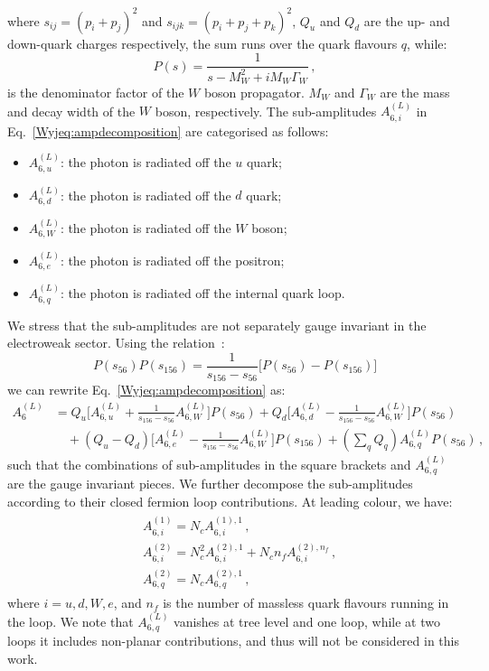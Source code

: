 \documentclass[main.tex]{subfiles}
\begin{document}
where $s_{ij}=(p_i+p_j)^2$ and $s_{ijk}=(p_i+p_j+p_k)^2$, $Q_u$ and $Q_d$ are the up- and down-quark charges respectively, the sum runs over the quark flavours $q$, while: 
\begin{equation}
P(s) = \frac{1}{s-M_W^2+i M_W \Gamma_W} \,,
\end{equation}
is the denominator factor of the $W$ boson propagator. 
$M_W$ and $\Gamma_W$ are the mass and decay width of the $W$ boson, respectively.
The sub-amplitudes $A_{6,i}^{(L)}$ in Eq.~\ref{Wyjeq:ampdecomposition} are categorised as follows:
\begin{itemize}
\item $A^{(L)}_{6,u}$: the photon is radiated off the $u$ quark;
\item $A^{(L)}_{6,d}$: the photon is radiated off the $d$ quark;
\item $A^{(L)}_{6,W}$: the photon is radiated off the $W$ boson;
\item $A^{(L)}_{6,e}$: the photon is radiated off the positron;
\item $A^{(L)}_{6,q}$: the photon is radiated off the internal quark loop.
\end{itemize}
%
We stress that the sub-amplitudes are not separately gauge invariant in the electroweak sector.
Using the relation~\cite{Campbell:2021mlr}:
\begin{equation}
P(s_{56})P(s_{156}) = \frac{1}{s_{156}-s_{56}} \bigg[ P(s_{56}) - P(s_{156}) \bigg] 
\end{equation}
we can rewrite Eq.~\ref{Wyjeq:ampdecomposition} as:
\begin{align}
A_{6}^{(L)} & =   Q_u \bigg[ A^{(L)}_{6,u} + \frac{1}{s_{156}-s_{56}} A^{(L)}_{6,W} \bigg] P(s_{56})
                + Q_d \bigg[ A^{(L)}_{6,d} - \frac{1}{s_{156}-s_{56}} A^{(L)}_{6,W} \bigg] P(s_{56}) \nonumber \\
&         \quad + (Q_u - Q_d) \bigg[ A^{(L)}_{6,e} - \frac{1}{s_{156}-s_{56}} A^{(L)}_{6,W} \bigg] P(s_{156})
          + \left(\sum_q Q_q\right) A^{(L)}_{6,q} P(s_{56}) \,, 
\label{Wyjeq:gaugeinvariantamps}
\end{align}
such that the combinations of sub-amplitudes in the square brackets and $A^{(L)}_{6,q}$ are the gauge invariant pieces.
We further decompose the sub-amplitudes according to their closed fermion loop contributions. At leading colour, we have:
\begin{align} \label{Wyjeq:NFdecomposition}
\begin{aligned}
& A^{(1)}_{6,i} = N_c A^{(1),1}_{6,i} \,, \\
& A^{(2)}_{6,i} = N_c^2 A^{(2),1}_{6,i} + N_c n_f A^{(2),n_f}_{6,i} \,, \\
& A^{(2)}_{6,q} = N_c A^{(2),1}_{6,q}  \,,
\end{aligned}
\end{align}
where  $i=u,d,W,e$, and $n_f$ is the number of massless quark flavours running in the loop. 
We note that $A^{(L)}_{6,q}$ vanishes at tree level and one loop, while at two loops it includes non-planar contributions, and thus will not be considered in this work.
\end{document}
